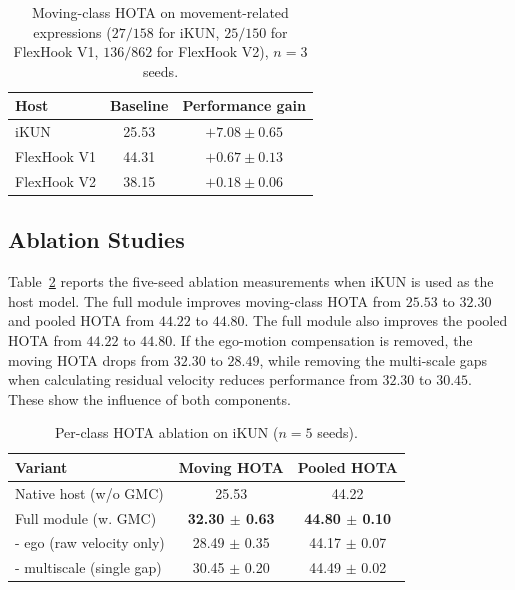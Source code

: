 \documentclass{article}
\begin{document}
\begin{table}
  \centering
  \caption{Moving-class HOTA on movement-related expressions ($27/158$ for iKUN, $25/150$ for FlexHook V1, $136/862$ for FlexHook V2), $n{=}3$ seeds.}
  \label{tab:deficit}
  \small
  \setlength{\tabcolsep}{2pt}
  \begin{tabular}{lcc}
    \hline
    Host        & Baseline & Performance gain \\
    \hline
    iKUN        & 25.53    & $+7.08\pm0.65$   \\
    FlexHook V1 & 44.31    & $+0.67\pm0.13$   \\
    FlexHook V2 & 38.15    & $+0.18\pm0.06$   \\
    \hline
  \end{tabular}
\end{table}

\subsection{Ablation Studies}
\label{sec:ablation}
Table~\ref{tab:ablation} reports the five-seed ablation measurements when iKUN is used as the host model. The full module improves moving-class HOTA from $25.53$ to $32.30$ and pooled HOTA from $44.22$ to $44.80$. The full module also improves the pooled HOTA from $44.22$ to $44.80$. If the ego-motion compensation is removed, the moving HOTA drops from $32.30$ to $28.49$, while removing the multi-scale gaps when calculating residual velocity reduces performance from $32.30$ to $30.45$. These show the influence of both components. 


\begin{table}
  \centering
  \caption{Per-class HOTA ablation on iKUN ($n{=}5$ seeds).}
  \label{tab:ablation}
  \small
  \setlength{\tabcolsep}{2pt}
  \begin{tabular}{lcc}
    \hline
    Variant                    & Moving HOTA               & Pooled HOTA               \\
    \hline
    Native host (w/o GMC)    & 25.53                     & 44.22                     \\
    Full module (w. GMC)             & \textbf{32.30 $\pm$ 0.63} & \textbf{44.80 $\pm$ 0.10} \\
    \quad - ego (raw velocity only)      & 28.49 $\pm$ 0.35          & 44.17 $\pm$ 0.07          \\
    \quad - multiscale (single gap) & 30.45 $\pm$ 0.20          & 44.49 $\pm$ 0.02          \\
    \hline
  \end{tabular}
\end{table}
\end{document}
